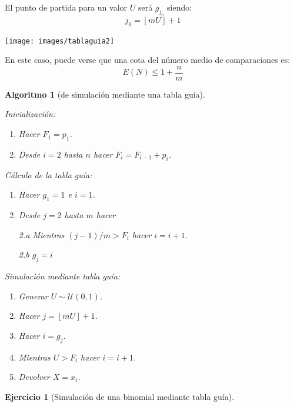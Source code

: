 \documentclass[
]{book}
\theoremstyle{break}
\newtheorem{conjecture}{Algoritmo}[chapter]
\theoremstyle{definition}
\theoremstyle{definition}
\theoremstyle{definition}
\newtheorem{exercise}{Ejercicio}[chapter]
\theoremstyle{definition}
\theoremstyle{remark}
\begin{document}
El punto de partida para un valor \(U\) será \(g_{j_{0}}\) siendo:
\[j_{0}=\left\lfloor mU\right\rfloor +1\]

\begin{center}\texttt{[image: images/tablaguia2]} \end{center}

En este caso, puede verse que una cota del número medio de comparaciones es:
\[E\left( N\right) \leq 1+\frac{n}{m}\]

\begin{conjecture}[de simulación mediante una tabla guía]
\protect\hypertarget{cnj:unnamed-chunk-18}{}{\label{cnj:unnamed-chunk-18} {} }

Inicialización:

\begin{enumerate}
\def\labelenumi{\arabic{enumi}.}
\item
  Hacer \(F_{1}=p_{1}\).
\item
  Desde \(i=2\) hasta \(n\) hacer \(F_{i}=F_{i-1}+p_{i}\).
\end{enumerate}

Cálculo de la tabla guía:

\begin{enumerate}
\def\labelenumi{\arabic{enumi}.}
\item
  Hacer \(g_{1}=1\) e \(i=1\).
\item
  Desde \(j=2\) hasta \(m\) hacer

  2.a Mientras \((j-1)/m>F_{i}\) hacer \(i=i+1\).

  2.b \(g_{j}=i\)
\end{enumerate}

Simulación mediante tabla guía:

\begin{enumerate}
\def\labelenumi{\arabic{enumi}.}
\item
  Generar \(U\sim \mathcal{U}\left( 0,1\right)\).
\item
  Hacer \(j=\left\lfloor mU\right\rfloor +1\).
\item
  Hacer \(i=g_{j}\).
\item
  Mientras \(U>F_{i}\) hacer \(i=i+1\).
\item
  Devolver \(X=x_{i}\).
\end{enumerate}
\end{conjecture}

\begin{exercise}[Simulación de una binomial mediante tabla guía]
\protect\hypertarget{exr:binom-tabla}{}{\label{exr:binom-tabla} {} }
\end{exercise}
\end{document}
